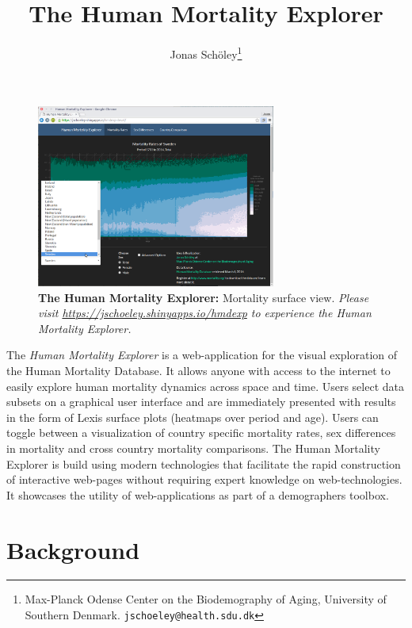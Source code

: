 \documentclass[
  12pt
]{scrartcl}
\title{The Human Mortality Explorer}
\subtitle{An Interactive Online Visualization \vskip 0.2em of the Human Mortality Database}
\author{
  Jonas Schöley\footnote{Max-Planck Odense Center on the Biodemography of Aging, University of Southern Denmark. \texttt{jschoeley@health.sdu.dk}}
}
\begin{document}
\maketitle

\thispagestyle{empty}

\begin{figure}[ht!]
  \centering
  \includegraphics[width = 0.7\textwidth]{./fig/hmd_screen_mx.png}
  \caption*{\textbf{The Human Mortality Explorer:} Mortality surface view.
  \textit{Please visit \url{https://jschoeley.shinyapps.io/hmdexp} to experience the Human Mortality Explorer.}}
\end{figure}

\begin{abstract2}
  The \emph{Human Mortality Explorer} is a web-application for the visual exploration of the Human Mortality Database. It allows anyone with access to the internet to easily explore human mortality dynamics across space and time. Users select data subsets on a graphical user interface and are immediately presented with results in the form of Lexis surface plots (heatmaps over period and age). Users can toggle between a visualization of country specific mortality rates, sex differences in mortality and cross country mortality comparisons. The Human Mortality Explorer is build using modern technologies that facilitate the rapid construction of interactive web-pages without requiring expert knowledge on web-technologies. It showcases the utility of web-applications as part of a demographers toolbox.
\end{abstract2}

\clearpage


\section*{Background}
\end{document}
